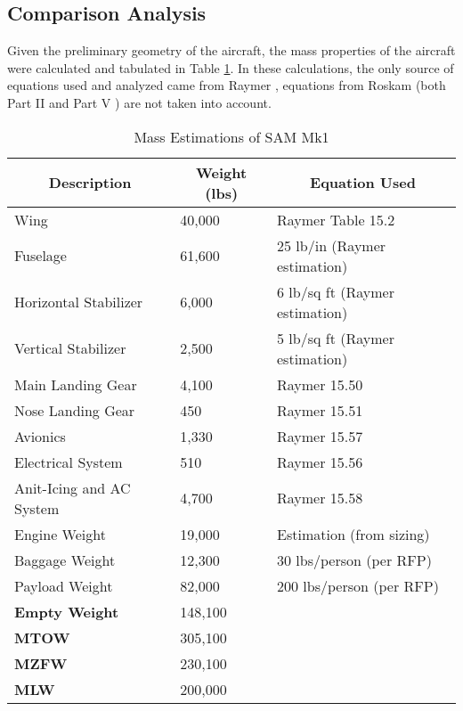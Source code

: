 \subsection{Comparison Analysis}
\label{subsection: comparison}
Given the preliminary geometry of the aircraft, the mass properties of the aircraft were calculated and tabulated in Table \ref{tab:mass_props}. In these calculations, the only source of equations used and analyzed came from Raymer \cite{raymer}, equations from Roskam (both Part II \cite{roskam_2} and Part V \cite{roskam_5}) are not taken into account. 

\begin{table}[!h]
\centering
\caption{Mass Estimations of SAM Mk1}
\begin{tabular}{|p{4cm}||p{2cm}|p{5cm}| }
\toprule
\multicolumn{1}{|c||}{\textbf{Description}} & \multicolumn{1}{c|}{\textbf{Weight (lbs)}} &  
\multicolumn{1}{c|}{\textbf{Equation Used}} \\ \hline \hline 
Wing & 40,000 & Raymer Table 15.2 \\ \hline
Fuselage & 61,600 & 25 lb/in (Raymer estimation) \\ \hline
Horizontal Stabilizer & 6,000 & 6 lb/sq ft (Raymer estimation) \\ \hline
Vertical Stabilizer & 2,500 & 5 lb/sq ft (Raymer estimation) \\ \hline
Main Landing Gear & 4,100 & Raymer 15.50 \\ \hline
Nose Landing Gear & 450 & Raymer 15.51 \\ \hline
Avionics & 1,330 & Raymer 15.57 \\ \hline
Electrical System & 510 & Raymer 15.56 \\ \hline
Anit-Icing and AC System & 4,700 & Raymer 15.58 \\ \hline
Engine Weight & 19,000 & Estimation (from sizing) \\ \hline
Baggage Weight & 12,300 & 30 lbs/person (per RFP) \\ \hline
Payload Weight & 82,000 & 200 lbs/person (per RFP) \\ \hline
\textbf{Empty Weight} & 148,100 &  \\ \hline
\textbf{MTOW} & 305,100 &  \\ \hline
\textbf{MZFW} & 230,100 &  \\ \hline
\textbf{MLW} & 200,000 &  \\
\bottomrule
\end{tabular}
\label{tab:mass_props}
\end{table}
\FloatBarrier

